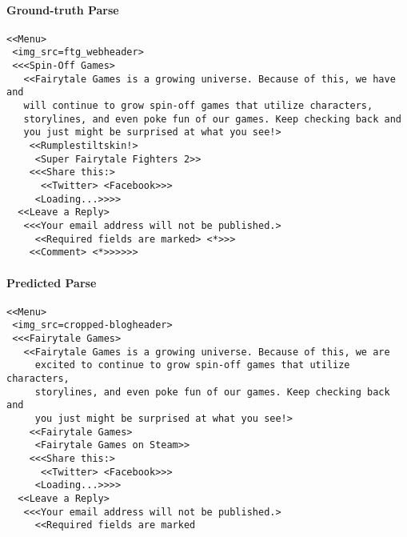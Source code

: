 \documentclass{article} \usepackage[accepted]{icml2023}
\begin{document}
\begin{figure*}
\small
\centering
{}
\begin{tcolorbox}
\paragraph{Ground-truth Parse}
\begin{verbatim}
<<Menu>
 <img_src=ftg_webheader>
 <<<Spin-Off Games>
   <<Fairytale Games is a growing universe. Because of this, we have and
   will continue to grow spin-off games that utilize characters,
   storylines, and even poke fun of our games. Keep checking back and
   you just might be surprised at what you see!>
    <<Rumplestiltskin!>
     <Super Fairytale Fighters 2>>
    <<<Share this:>
      <<Twitter> <Facebook>>>
     <Loading...>>>> 
  <<Leave a Reply> 
   <<<Your email address will not be published.> 
     <<Required fields are marked> <*>>>
    <<Comment> <*>>>>>>
\end{verbatim}
\end{tcolorbox}
\begin{tcolorbox}
\paragraph{Predicted Parse}
\begin{verbatim}
<<Menu>
 <img_src=cropped-blogheader>
 <<<Fairytale Games>
   <<Fairytale Games is a growing universe. Because of this, we are
     excited to continue to grow spin-off games that utilize characters,
     storylines, and even poke fun of our games. Keep checking back and
     you just might be surprised at what you see!> 
    <<Fairytale Games>
     <Fairytale Games on Steam>>
    <<<Share this:>
      <<Twitter> <Facebook>>>
     <Loading...>>>> 
  <<Leave a Reply> 
   <<<Your email address will not be published.> 
     <<Required fields are marked
\end{verbatim}
\end{tcolorbox}
\end{figure*}
\end{document}

